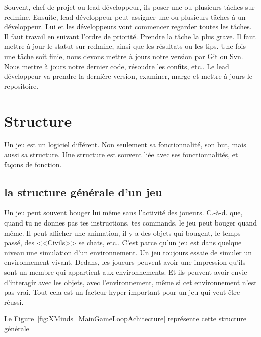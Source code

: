 Souvent, chef de projet ou lead développeur, ils poser une ou plusieurs tâches sur redmine. Ensuite, lead développeur peut assigner une ou plusieurs tâches à un développeur. Lui et les développeurs vont commencer regarder toutes les tâches. Il faut travail en suivant l'ordre de priorité. Prendre la tâche la plus grave. Il faut mettre à jour le statut sur redmine, ainsi que les résultats ou les tips. Une fois une tâche soit finie, nous devons mettre à jours notre version par Git ou Svn. Nous mettre à jours notre dernier code, résoudre les confits, etc.. Le lead développeur va prendre la dernière version, examiner, marge et mettre à jours le repositoire.




\section{Structure} %
\label{sec:structure}

Un jeu est un logiciel différent. Non seulement sa fonctionnalité, son but, mais aussi sa structure. Une structure est souvent liée avec ses fonctionnalités, et façons de fonction. 

\subsection{la structure générale d'un jeu} %
\label{sub:le_structure_général_d_un_jeu}

Un jeu peut souvent bouger lui même sans l'activité des joueurs. C.-à-d. que, quand tu ne donnes pas tes instructions, tes commands, le jeu peut bouger quand même. Il peut afficher une animation, il y a des objets qui bougent, le temps passé, des <<Civils>> se chats, etc.. C'est parce qu’un jeu est dans quelque niveau une simulation d'un environnement. Un jeu toujours essaie de simuler un environnement vivant. Dedans, les joueurs peuvent avoir une impression qu’ils sont un membre qui appartient aux environnements. Et ils peuvent avoir envie d’interagir avec les objets, avec l'environnement, même si cet environnement n'est pas vrai. Tout cela est un facteur hyper important pour un jeu qui veut être réussi.

Le Figure~\ref{fig:XMinds_MainGameLoopAchitecture} représente cette structure générale


